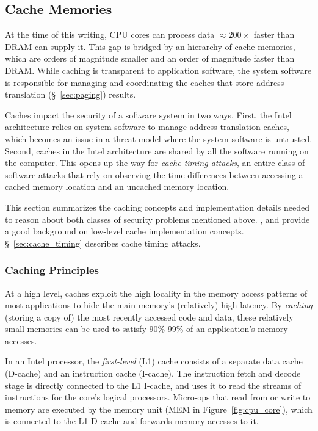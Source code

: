 \subsection{Cache Memories}
\label{sec:caching}

At the time of this writing, CPU cores can process data $\approx 200\times$
faster than DRAM can supply it. This gap is bridged by an hierarchy of cache
memories, which are orders of magnitude smaller and an order of magnitude
faster than DRAM. While caching is transparent to application software, the
system software is responsible for managing and coordinating the caches that
store address translation (\S~\ref{sec:paging}) results.

Caches impact the security of a software system in two ways. First, the Intel
architecture relies on system software to manage address translation caches,
which becomes an issue in a threat model where the system software is
untrusted. Second, caches in the Intel architecture are shared by all the
software running on the computer. This opens up the way for \textit{cache
timing attacks}, an entire class of software attacks that rely on observing the
time differences between accessing a cached memory location and an uncached
memory location.

This section summarizes the caching concepts and implementation details needed
to reason about both classes of security problems mentioned above.
\cite{smith1982cache}, \cite{patterson2013architecture} and
\cite{hennessy2012architecture} provide a good background on low-level cache
implementation concepts. \S~\ref{sec:cache_timing} describes cache timing
attacks.


\subsubsection{Caching Principles}
\label{sec:caching_intro}

At a high level, caches exploit the high locality in the memory access patterns
of most applications to hide the main memory's (relatively) high latency. By
\textit{caching} (storing a copy of) the most recently accessed code and data,
these relatively small memories can be used to satisfy 90\%-99\% of an
application's memory accesses.

In an Intel processor, the \textit{first-level} (L1) cache consists of a
separate data cache (D-cache) and an instruction cache (I-cache). The
instruction fetch and decode stage is directly connected to the L1 I-cache, and
uses it to read the streams of instructions for the core's logical processors.
Micro-ops that read from or write to memory are executed by the memory unit
(MEM in Figure~\ref{fig:cpu_core}), which is connected to the L1 D-cache and
forwards memory accesses to it.

